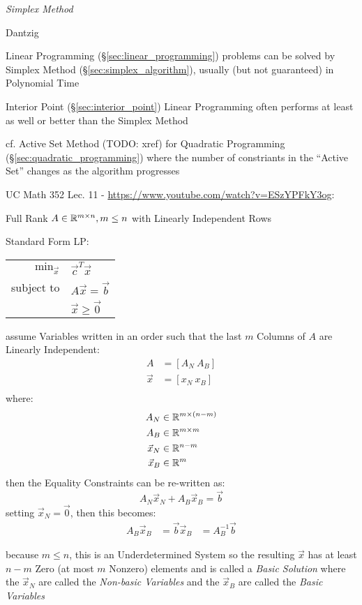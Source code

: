 \emph{Simplex Method}

Dantzig

Linear Programming (\S\ref{sec:linear_programming}) problems can be solved by
Simplex Method (\S\ref{sec:simplex_algorithm}), usually (but not guaranteed) in
Polynomial Time

\fist Interior Point (\S\ref{sec:interior_point}) Linear Programming often
performs at least as well or better than the Simplex Method

cf. Active Set Method (TODO: xref) for Quadratic Programming
(\S\ref{sec:quadratic_programming}) where the number of constriants in the
``Active Set'' changes as the algorithm progresses

UC Math 352 Lec. 11 - \url{https://www.youtube.com/watch?v=ESzYPFkY3og}:

Full Rank $A \in \mathbb{R}^{m \times n}, m \leq n$ with Linearly Independent Rows

Standard Form LP:

\begin{tabular}{r l}
  $\mathrm{min}_{\vec{x}}$ & $\vec{c}^T\vec{x}$     \\
  subject to               & $A\vec{x} = \vec{b}$   \\
                           & $\vec{x} \geq \vec{0}$ \\
\end{tabular}

assume Variables written in an order such that the last $m$ Columns of $A$ are
Linearly Independent:
\begin{align*}
  A       & = [A_N \ A_B] \\
  \vec{x} & = [x_N \ x_B] \\
\end{align*}
where:
\begin{align*}
  A_N       & \in \mathbb{R}^{m \times (n - m)} \\
  A_B       & \in \mathbb{R}^{m \times m} \\
  \vec{x}_N & \in \mathbb{R}^{n-m} \\
  \vec{x}_B & \in \mathbb{R}^m \\
\end{align*}
then the Equality Constraints can be re-written as:
\[
  A_N\vec{x}_N + A_B\vec{x}_B = \vec{b}
\]
setting $\vec{x}_N = \vec{0}$, then this becomes:
\begin{align*}
  A_B\vec{x}_B & = \vec{b}
  \vec{x}_B    & = A_B^{-1}\vec{b}
\end{align*}

because $m \leq n$, this is an Underdetermined System so the resulting
$\vec{x}$ has at least $n - m$ Zero (at most $m$ Nonzero) elements and is
called a \emph{Basic Solution} where the $\vec{x}_N$ are called the
\emph{Non-basic Variables} and the $\vec{x}_B$ are called the \emph{Basic
  Variables}

